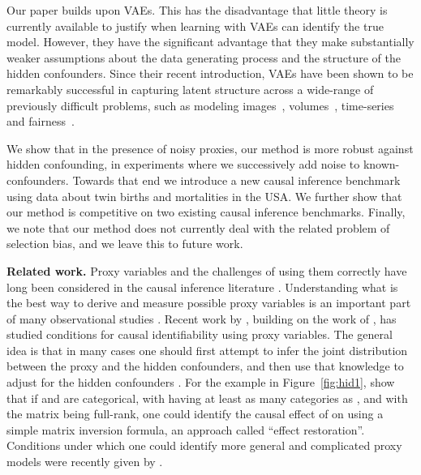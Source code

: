 \documentclass{article}
\begin{document}
Our paper builds upon VAEs. This has the disadvantage that little theory is currently available to justify when learning with VAEs can identify the true model. However, they have the significant advantage that they make substantially weaker assumptions about the data generating process and the structure of the hidden confounders. Since their recent introduction, VAEs have been shown to be remarkably successful in capturing latent structure across a wide-range of previously difficult problems, such as modeling images~\citep{gregor2015draw}, volumes~\citep{rezende2016unsupervised}, time-series~\citep{chung2015recurrent} and fairness~\citep{louizos2015variational}.

We show that in the presence of noisy proxies, our method is more robust against hidden confounding, in experiments where we successively add noise to known-confounders. Towards that end we introduce a new causal inference benchmark using data about twin births and mortalities in the USA. We further show that our method is competitive on two existing causal inference benchmarks. 
Finally, we note that our method does not currently deal with the related problem of selection bias, and we leave this to future work.







 
{\bf Related work.} \;
Proxy variables and the challenges of using them correctly have long been considered in the causal inference literature \citep{wickens1972note,frost1979proxy}. Understanding what is the best way to derive and measure possible proxy variables is an important part of many observational studies \citep{filmer2001estimating,kolenikov2009socioeconomic,wooldridge2009estimating}.
Recent work by \citet{cai2008identifying,greenland2008bias}, building on the work of \citet{greenland1983correcting,selen1986adjusting}, has studied conditions for causal identifiability using proxy variables.
The general idea is that in many cases one should first attempt to infer the joint distribution  between the proxy and the hidden confounders, and then use that knowledge to adjust for the hidden confounders \citep{wooldridge2009estimating,pearl2012measurement,kuroki2014measurement,miao2016identifying,edwards2015all}.
For the example in Figure~\ref{fig:hid1}, \citet{cai2008identifying,greenland2008bias,pearl2012measurement} show that if  and  are categorical, with  having at least as many categories as , and with the matrix  being full-rank, one could identify the causal effect of  on  using a simple matrix inversion formula, an approach called ``effect restoration''.
Conditions under which one could identify more general and complicated proxy models were recently given by \citep{miao2016identifying}. 
\end{document}

